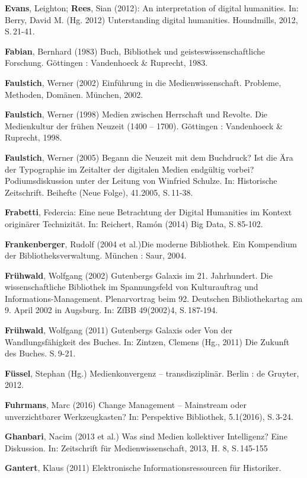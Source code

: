 \documentclass[a4paper,
fontsize=11pt,
oneside,
numbers=noperiodatend,
parskip=half-,
bibliography=totoc,
final
]{scrartcl}
\begin{document}
\textbf{Evans}, Leighton; \textbf{Rees}, Sian (2012): An interpretation
of digital humanities. In: Berry, David M. (Hg. 2012) Unterstanding
digital humanities. Houndmills, 2012, S.\,21-41.

\textbf{Fabian}, Bernhard (1983) Buch, Bibliothek und
geisteswissenschaftliche Forschung. Göttingen : Vandenhoeck \& Ruprecht,
1983.

\textbf{Faulstich}, Werner (2002) Einführung in die Medienwissenschaft.
Probleme, Methoden, Domänen. München, 2002.

\textbf{Faulstich}, Werner (1998) Medien zwischen Herrschaft und
Revolte. Die Medienkultur der frühen Neuzeit (1400 -- 1700). Göttingen :
Vandenhoeck \& Ruprecht, 1998.

\textbf{Faulstich}, Werner (2005) Begann die Neuzeit mit dem Buchdruck?
Ist die Ära der Typographie im Zeitalter der digitalen Medien endgültig
vorbei? Podiumsdiskussion unter der Leitung von Winfried Schulze. In:
Historische Zeitschrift. Beihefte (Neue Folge), 41.2005, S.\,11-38.

\textbf{Frabetti}, Federcia: Eine neue Betrachtung der Digital
Humanities im Kontext originärer Technizität. In: Reichert, Ramón (2014)
Big Data, S.\,85-102.

\textbf{Frankenberger}, Rudolf (2004 et al.)Die moderne Bibliothek. Ein
Kompendium der Bibliotheksverwaltung. München : Saur, 2004.

\textbf{Frühwald}, Wolfgang (2002) Gutenbergs Galaxis im 21.
Jahrhundert. Die wissenschaftliche Bibliothek im Spannungsfeld von
Kulturauftrag und Informations-Management. Plenarvortrag beim 92.
Deutschen Bibliothekartag am 9. April 2002 in Augsburg. In: ZfBB
49(2002)4, S.\,187-194.

\textbf{Frühwald}, Wolfgang (2011) Gutenbergs Galaxis oder Von der
Wandlungsfähigkeit des Buches. In: Zintzen, Clemens (Hg., 2011) Die
Zukunft des Buches. S.\,9-21.

\textbf{Füssel}, Stephan (Hg.) Medienkonvergenz -- transdisziplinär.
Berlin : de Gruyter, 2012.

\textbf{Fuhrmans}, Marc (2016) Change Management -- Mainstream oder
unverzichtbarer Werkzeugkasten? In: Perspektive Bibliothek, 5.1(2016),
S.\,3-24.

\textbf{Ghanbari}, Nacim (2013 et al.) Was sind Medien kollektiver
Intelligenz? Eine Diskussion. In: Zeitschrift für Medienwissenschaft,
2013, H. 8, S.\,145-155

\textbf{Gantert}, Klaus (2011) Elektronische Informationsressourcen für
Historiker.
\end{document}
